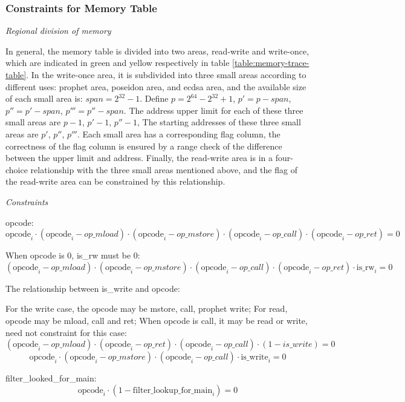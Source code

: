 \subsubsection{Constraints for Memory Table} \label{sec:memory-constraints}

\emph{Regional division of memory}

In general, the memory table is divided into two areas, read-write and write-once, which are indicated in green and yellow respectively in table \ref{table:memory-trace-table}.
In the write-once area, it is subdivided into three small areas according to different uses: prophet area, poseidon area, and ecdsa area, and the available size of each small area is:
$span = 2^{32} - 1$. Define $p =2^{64} - 2^{32} + 1$, $p'=p-span$, $p''=p'-span$, $p'''=p''-span$. The address upper limit for each of these three small areas are $p-1$, $p'-1$, $p''-1$,
The starting addresses of these three small areas are $p'$, $p''$, $p'''$.
Each small area has a corresponding flag column, the correctness of the flag column is ensured by a
range check of the difference between the upper limit and address. Finally, the read-write area is in a four-choice relationship with the three small areas mentioned above, and the
flag of the read-write area can be constrained by this relationship.

\emph{Constraints}

opcode:
\[\mathrm{opcode}_i \cdot (\mathrm{opcode}_i - op\_mload) \cdot (\mathrm{opcode}_i-op\_mstore) \cdot (\mathrm{opcode}_i-op\_call) \cdot (\mathrm{opcode}_i-op\_ret)=0 \]

When opcode is 0, is\_rw must be 0:
\[ (\mathrm{opcode}_i-op\_mload) \cdot (\mathrm{opcode}_i-op\_mstore) \cdot (\mathrm{opcode}_i-op\_call) \cdot (\mathrm{opcode}_i-op\_ret) \cdot \mathrm{is\_rw}_i=0 \]

The relationship between is\_write and opcode:

For the write case, the opcode may be mstore, call, prophet write; For read, opcode may be mload, call and ret; When opcode is call, it may be read or write, need not constraint for this case:
\[ (\mathrm{opcode}_i-op\_mload) \cdot (\mathrm{opcode}_i - op\_ret) \cdot (\mathrm{opcode}_i - op\_call) \cdot (1-is\_write) = 0 \]
\[ \mathrm{opcode}_i \cdot (\mathrm{opcode}_i - op\_mstore) \cdot (\mathrm{opcode}_i - op\_call) \cdot \mathrm{is\_write}_i=0 \]

filter\_looked\_for\_main:
\[ \mathrm{opcode}_i \cdot (1-\mathrm{filter\_lookup\_for\_main}_i)=0 \]

